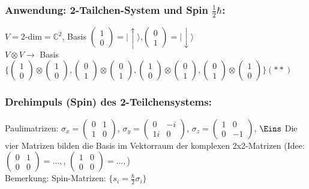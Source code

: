\documentclass[twoside,a4paper]{scrartcl}
\newcommand{\C}{\mathbb{C}}
\renewcommand{\1}{\mathds{1}}
\newcommand{\ra}{\rightarrow}
\renewcommand{\C}{\mathbb{C}}
\begin{document}
\subsubsection*{Anwendung: 2-Tailchen-System und Spin $\frac{1}{2}\hbar$:}
$V=2$-dim$=\C^2$, Basis $\begin{pmatrix}1 \\ 0 \end{pmatrix}=|\uparrow\rangle$,$\begin{pmatrix}0 \\ 1 \end{pmatrix}=|\downarrow\rangle$\\
$V\otimes V \ra$ Basis $\{\begin{pmatrix}1 \\ 0 \end{pmatrix} \otimes \begin{pmatrix}1 \\ 0 \end{pmatrix}, \begin{pmatrix}0 \\ 1 \end{pmatrix} \otimes \begin{pmatrix}0 \\ 1 \end{pmatrix}, \begin{pmatrix}1 \\ 0 \end{pmatrix} \otimes \begin{pmatrix}0 \\ 1 \end{pmatrix}, \begin{pmatrix}0 \\ 1 \end{pmatrix} \otimes \begin{pmatrix}1 \\ 0 \end{pmatrix} \} (**)$
\subsubsection*{Drehimpuls (Spin) des 2-Teilchensystems:}
Paulimatrizen: $\sigma_x=\begin{pmatrix}0 & 1 \\ 1 & 0 \end{pmatrix}$, $\sigma_y=\begin{pmatrix}0 & -i \\ 1i& 0 \end{pmatrix}$, $\sigma_z=\begin{pmatrix}1 & 0 \\ 0 & -1 \end{pmatrix}$, $\Eins$
Die vier Matrizen bilden die Basis im Vektorraum der komplexen 2x2-Matrizen (Idee: $\begin{pmatrix}0 & 1 \\ 0 & 0 \end{pmatrix}=...,$, $\begin{pmatrix}1 & 0 \\ 0 & 0 \end{pmatrix}=...,$)\\
Bemerkung: Spin-Matrizen: $\{ s_i=\frac{\hbar}{2}\sigma_i \}$
\end{document}
